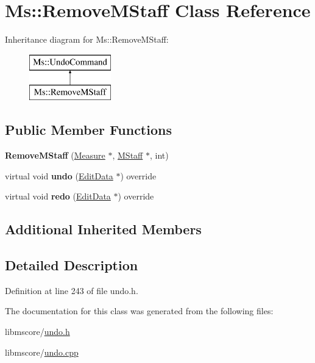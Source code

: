 \hypertarget{class_ms_1_1_remove_m_staff}{}\section{Ms\+:\+:Remove\+M\+Staff Class Reference}
\label{class_ms_1_1_remove_m_staff}
Inheritance diagram for Ms\+:\+:Remove\+M\+Staff\+:\begin{figure}[H]
\begin{center}
\leavevmode
\includegraphics[height=2.000000cm]{class_ms_1_1_remove_m_staff}
\end{center}
\end{figure}
\subsection*{Public Member Functions}
\begin{DoxyCompactItemize}
\item 
\mbox{\label{class_ms_1_1_remove_m_staff_af3c8efc87a6541457092da7c5046c848}} 
{\bfseries Remove\+M\+Staff} (\hyperlink{class_ms_1_1_measure}{Measure} $\ast$, \hyperlink{class_ms_1_1_m_staff}{M\+Staff} $\ast$, int)
\item 
\mbox{\label{class_ms_1_1_remove_m_staff_a03a40c8b3e37b843290825e1ade5068c}} 
virtual void {\bfseries undo} (\hyperlink{class_ms_1_1_edit_data}{Edit\+Data} $\ast$) override
\item 
\mbox{\label{class_ms_1_1_remove_m_staff_a21a4df819d58ead4a41f0222811116a4}} 
virtual void {\bfseries redo} (\hyperlink{class_ms_1_1_edit_data}{Edit\+Data} $\ast$) override
\end{DoxyCompactItemize}
\subsection*{Additional Inherited Members}


\subsection{Detailed Description}


Definition at line 243 of file undo.\+h.



The documentation for this class was generated from the following files\+:\begin{DoxyCompactItemize}
\item 
libmscore/\hyperlink{undo_8h}{undo.\+h}\item 
libmscore/\hyperlink{undo_8cpp}{undo.\+cpp}\end{DoxyCompactItemize}
